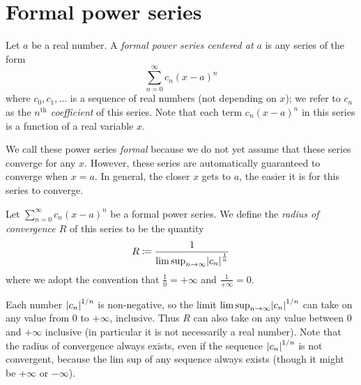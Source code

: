 \section{Formal power series}\label{sec:4.1}

\begin{defn}\label{4.1.1}
  Let \(a\) be a real number.
  A \emph{formal power series centered at \(a\)} is any series of the form
  \[
    \sum_{n = 0}^\infty c_n (x - a)^n
  \]
  where \(c_0, c_1, \dots\) is a sequence of real numbers (not depending on \(x\));
  we refer to \(c_n\) as the \emph{\(n^{\text{th}}\) coefficient} of this series.
  Note that each term \(c_n (x - a)^n\) in this series is a function of a real variable \(x\).
\end{defn}

\begin{note}
  We call these power series \emph{formal} because we do not yet assume that these series converge for any \(x\).
  However, these series are automatically guaranteed to converge when \(x = a\).
  In general, the closer \(x\) gets to \(a\), the easier it is for this series to converge.
\end{note}

\setcounter{thm}{2}
\begin{defn}\label{4.1.3}
  Let \(\sum_{n = 0}^\infty c_n (x - a)^n\) be a formal power series.
  We define the \emph{radius of convergence \(R\)} of this series to be the quantity
  \[
    R \coloneqq \frac{1}{\limsup_{n \to \infty} \abs{c_n}^{\frac{1}{n}}}
  \]
  where we adopt the convention that \(\frac{1}{0} = +\infty\) and \(\frac{1}{+\infty} = 0\).
\end{defn}

\begin{rmk}\label{4.1.4}
  Each number \(\left\lvert c_n\right\rvert^{1 / n}\) is non-negative, so the limit \(\limsup_{n \to \infty} \abs{c_n}^{1 / n}\) can take on any value from \(0\) to \(+\infty\), inclusive.
  Thus \(R\) can also take on any value between \(0\) and \(+\infty\) inclusive
  (in particular it is not necessarily a real number).
  Note that the radius of convergence always exists, even if the sequence \(\left\lvert c_n\right\rvert^{1 / n}\) is not convergent, because the lim sup of any sequence always exists
  (though it might be \(+\infty\) or \(-\infty\)).
\end{rmk}

